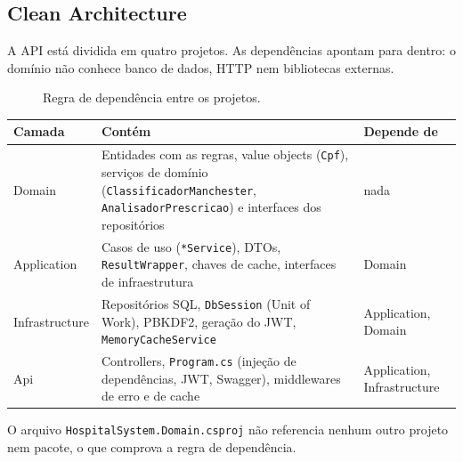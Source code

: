 \documentclass[12pt,a4paper]{article}
\newcommand{\cod}[1]{\texttt{#1}}
\begin{document}
\subsection{Clean Architecture}

A API está dividida em quatro projetos. As dependências apontam para dentro: o domínio não
conhece banco de dados, HTTP nem bibliotecas externas.

\begin{figure}[h]
\centering
{}
\caption{Regra de dependência entre os projetos.}
\end{figure}

\begin{tabularx}{\textwidth}{@{}lLl@{}}
\toprule
\textbf{Camada} & \textbf{Contém} & \textbf{Depende de} \\
\midrule
Domain         & Entidades com as regras, value objects (\cod{Cpf}), serviços de domínio
                 (\cod{ClassificadorManchester}, \cod{AnalisadorPrescricao}) e interfaces dos repositórios & nada \\
Application    & Casos de uso (\cod{*Service}), DTOs, \cod{ResultWrapper}, chaves de cache,
                 interfaces de infraestrutura & Domain \\
Infrastructure & Repositórios SQL, \cod{DbSession} (Unit of Work), PBKDF2, geração do JWT,
                 \cod{MemoryCacheService} & Application, Domain \\
Api            & Controllers, \cod{Program.cs} (injeção de dependências, JWT, Swagger),
                 middlewares de erro e de cache & Application, Infrastructure \\
\bottomrule
\end{tabularx}

\medskip
O arquivo \cod{HospitalSystem.Domain.csproj} não referencia nenhum outro projeto nem pacote,
o que comprova a regra de dependência.
\end{document}
